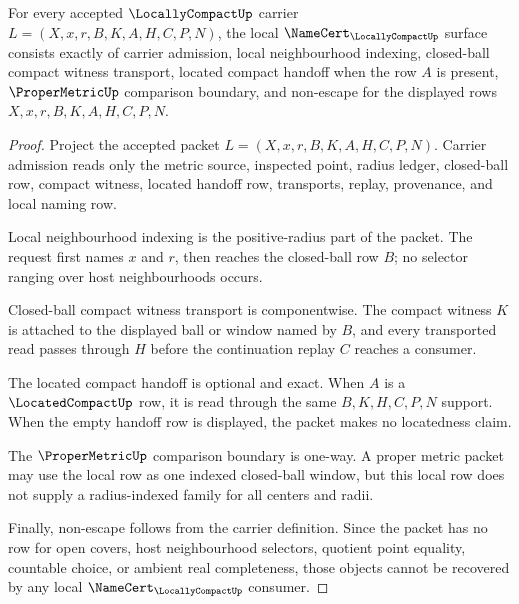 \begin{theorem}
\label{thm:locally-compact-namecert-obligations}
For every accepted $\LocallyCompactUp$ carrier $L=(X,x,r,B,K,A,H,C,P,N)$, the local $\NameCert_{\LocallyCompactUp}$ surface consists exactly of carrier admission, local neighbourhood indexing, closed-ball compact witness transport, located compact handoff when the row $A$ is present, $\ProperMetricUp$ comparison boundary, and non-escape for the displayed rows $X,x,r,B,K,A,H,C,P,N$.
\end{theorem}
\begin{proof}
Project the accepted packet $L=(X,x,r,B,K,A,H,C,P,N)$. Carrier admission reads only the metric source, inspected point, radius ledger, closed-ball row, compact witness, located handoff row, transports, replay, provenance, and local naming row.

Local neighbourhood indexing is the positive-radius part of the packet. The request first names $x$ and $r$, then reaches the closed-ball row $B$; no selector ranging over host neighbourhoods occurs.

Closed-ball compact witness transport is componentwise. The compact witness $K$ is attached to the displayed ball or window named by $B$, and every transported read passes through $H$ before the continuation replay $C$ reaches a consumer.

The located compact handoff is optional and exact. When $A$ is a $\LocatedCompactUp$ row, it is read through the same $B,K,H,C,P,N$ support. When the empty handoff row is displayed, the packet makes no locatedness claim.

The $\ProperMetricUp$ comparison boundary is one-way. A proper metric packet may use the local row as one indexed closed-ball window, but this local row does not supply a radius-indexed family for all centers and radii.

Finally, non-escape follows from the carrier definition. Since the packet has no row for open covers, host neighbourhood selectors, quotient point equality, countable choice, or ambient real completeness, those objects cannot be recovered by any local $\NameCert_{\LocallyCompactUp}$ consumer.
\end{proof}

